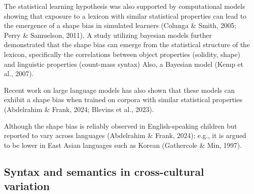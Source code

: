 \documentclass[
  english,
  man]{apa6}
\begin{document}
The statistical learning hypothesis was also supported by computational models showing that exposure to a lexicon with similar statistical properties can lead to the emergence of a shape bias in simulated learners (Colunga \& Smith, 2005; Perry \& Samuelson, 2011). A study utilizing bayesian models further demonstrated that the shape bias can emerge from the statistical structure of the lexicon, specifically the correlations between object properties (solidity, shape) and linguistic properties (count-mass syntax)
Also, a Bayesian model (Kemp et al., 2007).

Recent work on large language models has also shown that these models can exhibit a shape bias when trained on corpora with similar statistical properties (Abdelrahim \& Frank, 2024; Blevins et al., 2023).

Although the shape bias is reliably observed in English-speaking children but reported to vary across languages (Abdelrahim \& Frank, 2024); e.g., it is argued to be lower in East Asian languages such as Korean (Gathercole \& Min, 1997).

\subsection{Syntax and semantics in cross-cultural variation}\label{syntax-and-semantics-in-cross-cultural-variation}
\end{document}
